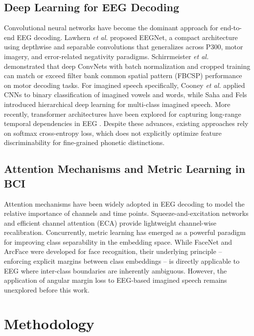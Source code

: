 \documentclass[conference]{IEEEtran}
\newcommand{\etal}{\textit{et al.}}
\begin{document}
\subsection{Deep Learning for EEG Decoding}
Convolutional neural networks have become the dominant approach for end-to-end EEG decoding. Lawhern \etal \cite{lawhern2018eegnet} proposed EEGNet, a compact architecture using depthwise and separable convolutions that generalizes across P300, motor imagery, and error-related negativity paradigms. Schirrmeister \etal \cite{schirrmeister2017deep} demonstrated that deep ConvNets with batch normalization and cropped training can match or exceed filter bank common spatial pattern (FBCSP) performance on motor decoding tasks. For imagined speech specifically, Cooney \etal \cite{cooney2019imagined} applied CNNs to binary classification of imagined vowels and words, while Saha and Fels \cite{saha2019hierarchical} introduced hierarchical deep learning for multi-class imagined speech. More recently, transformer architectures have been explored for capturing long-range temporal dependencies in EEG \cite{wang2022transformer}. Despite these advances, existing approaches rely on softmax cross-entropy loss, which does not explicitly optimize feature discriminability for fine-grained phonetic distinctions.

\subsection{Attention Mechanisms and Metric Learning in BCI}
Attention mechanisms have been widely adopted in EEG decoding to model the relative importance of channels and time points. Squeeze-and-excitation networks \cite{hu2018squeeze} and efficient channel attention (ECA) \cite{wang2020eca} provide lightweight channel-wise recalibration. Concurrently, metric learning has emerged as a powerful paradigm for improving class separability in the embedding space. While FaceNet \cite{schroff2015facenet} and ArcFace \cite{deng2019arcface} were developed for face recognition, their underlying principle -- enforcing explicit margins between class embeddings -- is directly applicable to EEG where inter-class boundaries are inherently ambiguous. However, the application of angular margin loss to EEG-based imagined speech remains unexplored before this work.

\section{Methodology}
\end{document}
